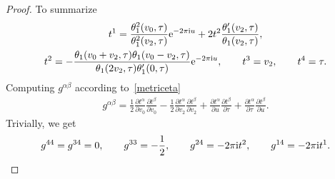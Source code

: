 \documentclass[10pt,a4paper]{amsart}
\numberwithin{equation}{section}
\begin{document}
\begin{proof}
To summarize
\begin{gather*}
t^1=\frac{\theta_1^2(v_0,\tau)}{\theta_1^2(v_2,\tau)}{\rm e}^{-2\pi {\rm i} u}+2t^2\frac{\theta_1^{\prime}(v_2,\tau)}{\theta_1(v_2,\tau)},\nonumber
\\
t^2=-\frac{\theta_1(v_0+v_2,\tau)\theta_1(v_0-v_2,\tau)} {\theta_1(2v_2,\tau)\theta_1^{\prime}(0,\tau)}{\rm e}^{-2\pi {\rm i} u},
\qquad
t^3=v_2,
\qquad
t^4=\tau.
\end{gather*}
Computing $g^{\alpha\beta}$ according to~\eqref{metriceta}
\begin{gather*}
g^{\alpha\beta}=\frac{1}{2}\frac{\partial t^{\alpha}}{\partial v_0}\frac{\partial t^{\beta}}{\partial v_0}-\frac{1}{2}\frac{\partial t^{\alpha}}{\partial v_2}\frac{\partial t^{\beta}}{\partial v_2}+\frac{\partial t^{\alpha}}{\partial u}\frac{\partial t^{\beta}}{\partial \tau}+\frac{\partial t^{\alpha}}{\partial \tau}\frac{\partial t^{\beta}}{\partial u}.
\end{gather*}
Trivially, we get
\begin{gather*}
g^{44}=g^{34}=0,\qquad
g^{33}=-\frac{1}{2},\qquad
g^{24}=-2\pi {\rm i}t^2,\qquad
g^{14}=-2\pi {\rm i}t^1.
\end{gather*}


\end{proof}
\end{document}
